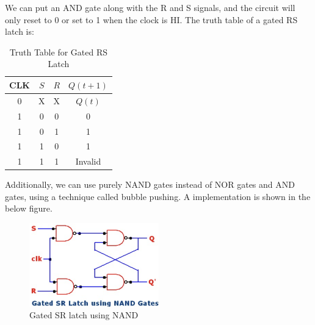 \documentclass[11pt]{report}
\begin{document}
\begin{definition}
    We can put an AND gate along with the R and S signals, and the circuit will only reset to 0 or set to 1 when the clock is HI. The truth table of a gated RS latch is: 
    
    \begin{table}[h!]
        \centering
        \begin{tabular}{|c|c|c||c|}
            \hline
            CLK & $S$ & $R$ & $Q(t+1)$ \\
            \hline
            0 & X & X & $Q(t)$ \\
            1 & 0 & 0 & 0 \\
            1 & 0 & 1 & 1 \\
            1 & 1 & 0 & 1 \\
            1 & 1 & 1 & Invalid \\
            \hline
        \end{tabular}
        \caption{Truth Table for Gated RS Latch}
        \label{tab:rs_latch_truth_table}
    \end{table}
    \newpage
    Additionally, we can use purely NAND gates instead of NOR gates and AND gates, using a technique called bubble pushing. A implementation is shown in the below figure.
    \begin{figure}[h!]
        \includegraphics[width=0.5\textwidth]{RS-with-NAND.png}
        \centering
        \caption{Gated SR latch using NAND}
    \end{figure}
\end{definition}
\end{document}
